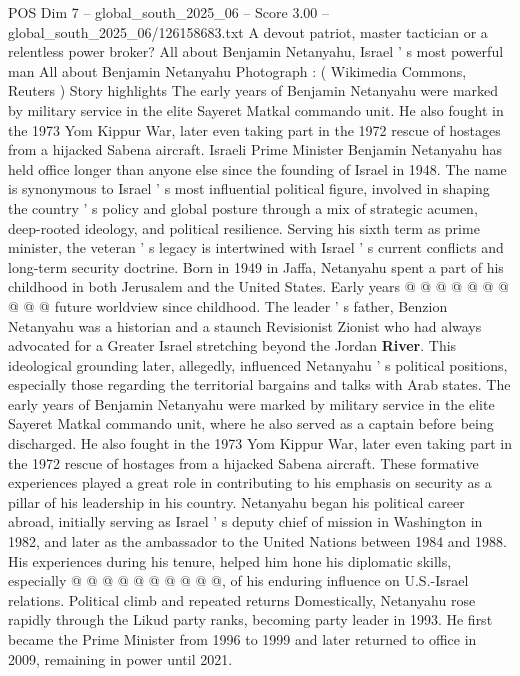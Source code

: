 \begin{textsample}{POS Dim 7 – global\_south\_2025\_06 – Score 3.00 – global\_south\_2025\_06/126158683.txt}  \label{ex:f7_pos_402}
A devout patriot, master tactician or a relentless power broker?
All about Benjamin Netanyahu, Israel ' s most powerful man All about Benjamin Netanyahu Photograph : ( Wikimedia Commons, Reuters ) Story highlights The early years of Benjamin Netanyahu were marked by military service in the elite Sayeret Matkal commando unit.
He also fought in the 1973 Yom Kippur War, later even taking part in the 1972 rescue of hostages from a hijacked Sabena aircraft.
Israeli Prime Minister Benjamin Netanyahu has held office longer than anyone else since the founding of Israel in 1948.
The name is synonymous to Israel ' s most influential political figure, involved in shaping the country ' s policy and global posture through a mix of strategic acumen, deep-rooted ideology, and political resilience.
Serving his sixth term as prime minister, the veteran ' s legacy is intertwined with Israel ' s current conflicts and long-term security doctrine.
Born in 1949 in Jaffa, Netanyahu spent a part of his childhood in both Jerusalem and the United States.
Early years @ @ @ @ @ @ @ @ @ @ future worldview since childhood.
The leader ' s father, Benzion Netanyahu was a historian and a staunch Revisionist Zionist who had always advocated for a Greater Israel stretching beyond the Jordan \textbf{River}.
This ideological grounding later, allegedly, influenced Netanyahu ' s political positions, especially those regarding the territorial bargains and talks with Arab states.
The early years of Benjamin Netanyahu were marked by military service in the elite Sayeret Matkal commando unit, where he also served as a captain before being discharged.
He also fought in the 1973 Yom Kippur War, later even taking part in the 1972 rescue of hostages from a hijacked Sabena aircraft.
These formative experiences played a great role in contributing to his emphasis on security as a pillar of his leadership in his country.
Netanyahu began his political career abroad, initially serving as Israel ' s deputy chief of mission in Washington in 1982, and later as the ambassador to the United Nations between 1984 and 1988.
His experiences during his tenure, helped him hone his diplomatic skills, especially @ @ @ @ @ @ @ @ @ @, of his enduring influence on U.S.-Israel relations.
Political climb and repeated returns Domestically, Netanyahu rose rapidly through the Likud party ranks, becoming party leader in 1993.
He first became the Prime Minister from 1996 to 1999 and later returned to office in 2009, remaining in power until 2021.

\end{textsample}
